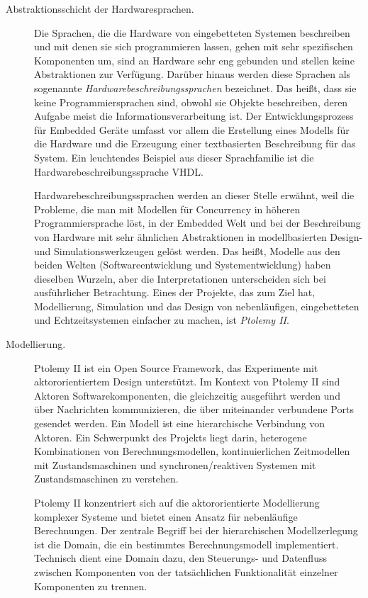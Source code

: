 \begin{description} 
	\item[Abstraktionsschicht der Hardwaresprachen.] Die Sprachen, die die Hardware von eingebetteten Systemen beschreiben und mit denen sie sich programmieren lassen, gehen mit sehr spezifischen Komponenten um, sind an Hardware sehr eng gebunden und stellen keine Abstraktionen zur Verfügung. Darüber hinaus werden diese Sprachen als sogenannte \textit{Hardwarebeschreibungssprachen} bezeichnet. Das heißt, dass sie keine Programmiersprachen sind, obwohl sie Objekte beschreiben, deren Aufgabe meist die Informationsverarbeitung ist. Der Entwicklungsprozess für Embedded Geräte umfasst vor allem die Erstellung eines Modells für die Hardware und die Erzeugung einer textbasierten Beschreibung für das System. Ein leuchtendes Beispiel aus dieser Sprachfamilie ist die Hardwarebeschreibungssprache VHDL.
	
	Hardwarebeschreibungssprachen werden an dieser Stelle erwähnt, weil die Probleme, die man mit Modellen für Concurrency in höheren Programmiersprache löst, in der Embedded Welt und bei der Beschreibung von Hardware mit sehr ähnlichen Abstraktionen in modellbasierten Design- und Simulationswerkzeugen gelöst werden. Das heißt, Modelle aus den beiden Welten (Softwareentwicklung und Systementwicklung) haben dieselben Wurzeln, aber die Interpretationen unterscheiden sich bei ausführlicher Betrachtung. Eines der Projekte, das zum Ziel hat, Modellierung, Simulation und das Design von nebenläufigen, eingebetteten und Echtzeitsystemen einfacher zu machen, ist \textit{Ptolemy II}.
	
	
	\item[Modellierung.] Ptolemy II ist ein Open Source Framework, das Experimente mit aktororientiertem Design unterstützt. Im Kontext von Ptolemy II sind Aktoren Softwarekomponenten, die gleichzeitig ausgeführt werden und über Nachrichten kommunizieren, die über miteinander verbundene Ports gesendet werden. Ein Modell ist eine hierarchische Verbindung von Aktoren. Ein Schwerpunkt des Projekts liegt darin, heterogene Kombinationen von Berechnungsmodellen, kontinuierlichen Zeitmodellen mit Zustandsmaschinen und synchronen/reaktiven Systemen mit Zustandsmaschinen zu verstehen.
	
	Ptolemy II konzentriert sich auf die aktororientierte Modellierung komplexer Systeme und bietet einen Ansatz für nebenläufige Berechnungen. Der zentrale Begriff bei der hierarchischen Modellzerlegung ist die Domain, die ein bestimmtes Berechnungsmodell implementiert. Technisch dient eine Domain dazu, den Steuerungs- und Datenfluss zwischen Komponenten von der tatsächlichen Funktionalität einzelner Komponenten zu trennen.
	

\end{description}
